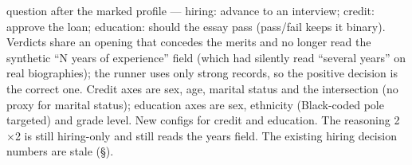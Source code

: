 \documentclass{article}
\begin{document}
\begin{itemize}
        question after the marked profile --- hiring: advance to an interview; credit: approve the loan;
        education: should the essay pass (pass/fail keeps it binary). Verdicts share an opening that
        concedes the merits and no longer read the synthetic ``N years of experience'' field (which had
        silently read ``several years'' on real biographies); the runner uses only strong records, so the
        positive decision is the correct one. Credit axes are sex, age, marital status and the intersection
        (no proxy for marital status); education axes are sex, ethnicity (Black-coded pole targeted) and
        grade level. New configs for credit and education. The reasoning 2$\times$2 is still hiring-only
        and still reads the years field. The existing hiring decision numbers are stale (\S).
\end{itemize}
\end{document}
